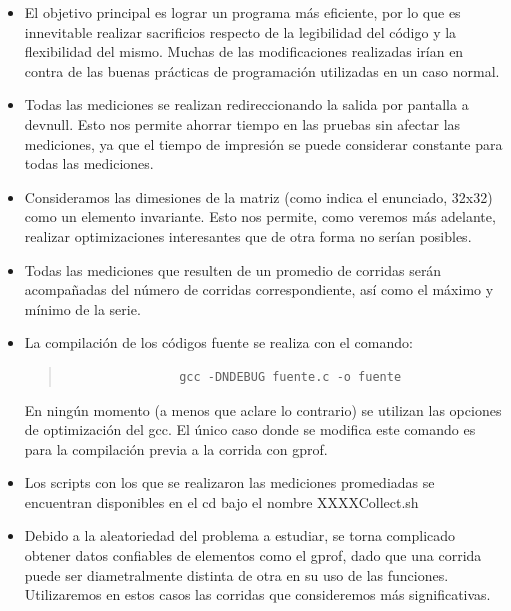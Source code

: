 \documentclass[a4paper,10pt]{article}
\begin{document}
\begin{itemize}
 \item {El objetivo principal es lograr un programa m\'as eficiente, por lo que es innevitable realizar sacrificios respecto de la legibilidad del c\'odigo y la flexibilidad del mismo. Muchas de las modificaciones realizadas ir\'ian en contra de las buenas pr\'acticas de programaci\'on utilizadas en un caso normal. }
	
 \item {Todas las mediciones se realizan redireccionando la salida por pantalla a \/dev\/null. Esto nos permite ahorrar tiempo en las pruebas sin afectar las mediciones, ya que el tiempo de impresi\'on se puede considerar constante para todas las mediciones.}
 
 \item {Consideramos las dimesiones de la matriz (como indica el enunciado, 32x32) como un elemento invariante. Esto nos permite, como veremos m\'as adelante, realizar optimizaciones interesantes que de otra forma no ser\'ian posibles.}
 
 \item {Todas las mediciones que resulten de un promedio de corridas ser\'an acompa\~nadas del n\'umero de corridas correspondiente, as\'i como el m\'aximo y m\'inimo de la serie.}
 \item {La compilaci\'on de los c\'odigos fuente se realiza con el comando: 
		\begin{quote}
			\begin{verbatim}
				gcc -DNDEBUG fuente.c -o fuente
			\end{verbatim}
		\end{quote}
	En ning\'un momento (a menos que aclare lo contrario) se utilizan las opciones de optimizaci\'on del gcc. El \'unico caso donde se modifica este comando es para la compilaci\'on previa a la corrida con gprof.}
 \item {Los scripts con los que se realizaron las mediciones promediadas se encuentran disponibles en el cd bajo el nombre XXXXCollect.sh}
 
 \item {Debido a la aleatoriedad del problema a estudiar, se torna complicado obtener datos confiables de elementos como el gprof, dado que una corrida puede ser diametralmente distinta de otra en su uso de las funciones. Utilizaremos en estos casos las corridas que consideremos m\'as significativas.}
 
\end{itemize}
	
\end{document}
